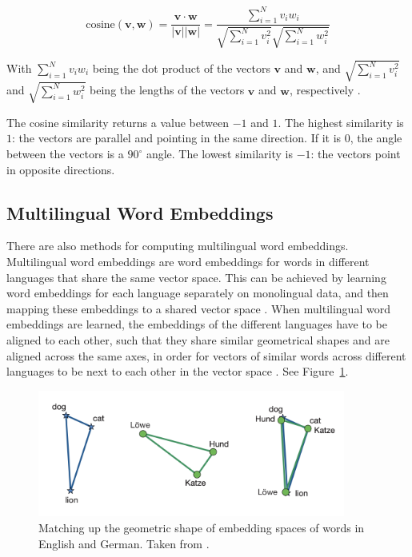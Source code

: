 \begin{equation}
	\text{cosine}(\mathbf{v}, \mathbf{w}) =
	\frac{
	\mathbf{v} \cdot \mathbf{w}
	}{|\mathbf{v}||\mathbf{w}|}
	=
	\frac{
	\sum_{i=1}^N v_i w_i
	}
	{
	\sqrt{\sum_{i=1}^N v_i^2} \sqrt{\sum_{i=1}^N w_i^2}
	}	
\end{equation}

With $\sum_{i=1}^Nv_iw_i$ being the dot product of the vectors $\mathbf{v}$ and $\mathbf{w}$, and $\sqrt{\sum_{i=1}^N v_i^2}$ and $\sqrt{\sum_{i=1}^N w_i^2}$ being the lengths of the vectors $\mathbf{v}$ and $\mathbf{w}$, respectively \autocite[103-104]{jurafsky-2019}.

The cosine similarity returns a value between $-1$ and $1$. 
The highest  similarity is \(1\): the vectors are parallel and pointing in the same direction. 
If it is $0$, the angle between the vectors is a $90^\circ$ angle. 
The lowest similarity is $-1$: the vectors point in opposite directions.

\subsection{Multilingual Word Embeddings}
\label{subsec:multilingual-word-embeddings}
There are also methods for computing multilingual word embeddings. 
Multilingual word embeddings are word embeddings for words in different languages that share the same vector space. 
This can be achieved by learning word embeddings for each language separately on monolingual data, and then mapping these embeddings to a shared vector space \autocite{artetxe-etal-2018-robust}. 
When multilingual word embeddings are learned, the embeddings of the different languages have to be aligned to each other, such that they share similar geometrical shapes and are aligned across the same axes, in order for vectors of similar words across different languages to be next to each other in the vector space \autocite[220-223]{koehn-2020}. See Figure~\ref{fig:embedding-alignment}.


\begin{figure}[ht]
\centering
\includegraphics[width=0.9\textwidth]{graphics/embedding-alignment.png}
\caption[Matching up the geometric shape of embedding spaces of words in English and German]{Matching up the geometric shape of embedding spaces of words in English and German. 
Taken from \textcite[223]{koehn-2020}.}
\label{fig:embedding-alignment}
\end{figure}

